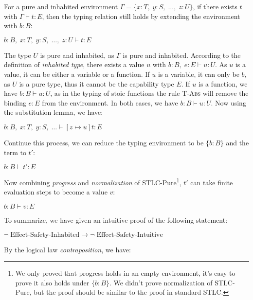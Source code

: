 For a pure and inhabited environment
$\Gamma = \{x:T, \; y:S, \; \dots, \; z:U\}$, if there exists $t$ with
$\Gamma \vdash t : E$, then the typing relation still holds by
extending the environment with $b:B$:

\begin{center}
$b:B, \; x:T, \; y:S, \; \dots, \; z:U \vdash t: E$
\end{center}

The type $U$ is pure and inhabited, as $\Gamma$ is pure and
inhabited. According to the definition of \emph{inhabited type}, there
exists a value $u$ with $b:B, \; e:E \vdash u: U$. As $u$ is a value,
it can be either a variable or a function. If $u$ is a variable, it
can only be $b$, as $U$ is a pure type, thus it cannot be the
capability type $E$. If $u$ is a function, we have $b:B \vdash u: U$,
as in the typing of stoic functions the rule \textsc{T-Abs} will
remove the binding $e:E$ from the environment. In both cases, we have
$b:B \vdash u: U$. Now using the substitution lemma, we have:

\begin{center}
$b:B, \; x:T, \; y:S, \; \dots \vdash [z \mapsto u]t: E$
\end{center}

Continue this process, we can reduce the typing environment to be
$\{b:B\}$ and the term to $t'$:

\begin{center}
$b:B \vdash t': E$
\end{center}

Now combining \emph{progress} and \emph{normalization} of
STLC-Pure\footnote{We only proved that progress holds in an empty
  environment, it's easy to prove it also holds under $\{b:B\}$. We
  didn't prove normalization of STLC-Pure, but the proof should be
  similar to the proof in standard STLC.}, $t'$ can take finite
evaluation steps to become a value $v$:

\begin{center}
$b:B \vdash v: E$
\end{center}

To summarize, we have given an intuitive proof of the following
statement:

\begin{center}
  $\neg \; \text{Effect-Safety-Inhabited} \to \neg \;
  \text{Effect-Safety-Intuitive}$
\end{center}

By the logical law \emph{contraposition}, we have:

